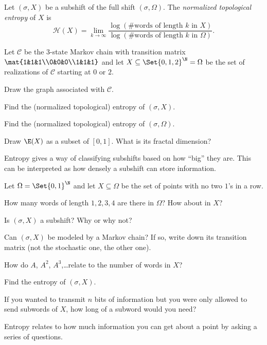 	\begin{definition}
		Let $(\sigma, X)$ be a subshift of the full shift $(\sigma, \Omega)$. The \emph{normalized topological entropy}
		of $X$ is
		\[
			\mathcal H(X) = \lim_{k\to\infty}\frac{\log(\text{\# words of length $k$ in $X$})}{\log(\text{\# words of length $k$ in $\Omega$})}.
		\]
	\end{definition}

	\question
	Let $\mathcal C$ be the $3$-state Markov chain with transition matrix $\mat{1&1&1\\0&0&0\\1&1&1}$
	and let $X\subseteq \Set{0,1,2}^\N=\Omega$ be the set of realizations of $\mathcal C$ starting at $0$ or $2$.
	\begin{parts}
		\item Draw the graph associated with $\mathcal C$.
		\item Find the (normalized topological) entropy of $(\sigma, X)$.
		\item Find the (normalized topological) entropy of $(\sigma, \Omega)$.
		\item Draw $\E(X)$ as a subset of $[0,1]$. What is its fractal dimension?
	\end{parts}

	\newpage
	Entropy gives a way of classifying subshifts based on how ``big'' they are. This can be interpreted
	as how densely a subshift can store information.

	\question
	Let $\Omega=\Set{0,1}^\N$ and let $X\subseteq \Omega$ be the set of points with no two $1$'s in a row.
	\begin{parts}
		\item How many words of length $1,2,3,4$ are there in $\Omega$? How about in $X$?
		\item Is $(\sigma, X)$ a subshift? Why or why not?
		\item Can $(\sigma, X)$ be modeled by a Markov chain? If so, write down its transition matrix (not the stochastic one,
			the other one).
		\item How do $A$, $A^2$, $A^3$,\ldots relate to the number of words in $X$?
		\item Find the entropy of $(\sigma, X)$.
		\item If you wanted to transmit $n$ bits of information but you were only allowed to send subwords of $X$, how long of a subword
			would you need?
	\end{parts}

	\newpage
	Entropy relates to how much information you can get about a point by asking a series of questions.

